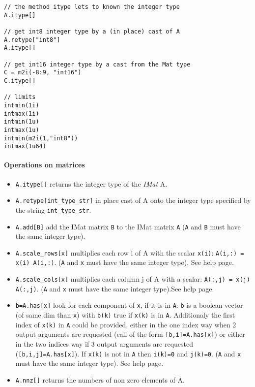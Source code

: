 \begin{mandescription}
\begin{Verbatim}
// the method itype lets to known the integer type
A.itype[]

// get int8 integer type by a (in place) cast of A
A.retype["int8"]
A.itype[]

// get int16 integer type by a cast from the Mat type
C = m2i(-8:9, "int16")
C.itype[]

// limits
intmin(1i)
intmax(1i)
intmin(1u)
intmax(1u)
intmin(m2i(1,"int8"))
intmax(1u64)
\end{Verbatim}


\end{mandescription}

\paragraph{Operations on matrices}


\begin{itemize}
\item \verb+A.itype[]+ returns the integer type of the \emph{IMat} A.
\item \verb+A.retype[int_type_str]+ in place cast of A onto the integer type specified by the string \verb+int_type_str+.
\item \verb+A.add[B]+  add the IMat matrix \verb+B+ to the IMat matrix \verb+A+ (\verb+A+ and \verb+B+ must have
the same  integer type).
\item \verb+A.scale_rows[x]+ multiplies each row i of A with the scalar \verb+x(i)+:
  \verb+A(i,:) = x(i) A(i,:)+.  (\verb+A+ and \verb+x+ must have the same  integer type). See  help page.
\item \verb+A.scale_cols[x]+ multiplies each column j of A with a scalar:
  \verb+A(:,j) = x(j) A(:,j)+. (\verb+A+ and \verb+x+ must have the same  integer type).See  help page.
\item \verb+b=A.has[x]+ look for each component of \verb+x+, 
  if it is in \verb+A+: \verb+b+ is a boolean vector 
  (of same dim than \verb+x+) with \verb+b(k)+ true if
  \verb+x(k)+ is in \verb+A+. Additionaly the first index of
  \verb+x(k)+ in \verb+A+ could be provided, either in the one index way
  when 2 output arguments are requested (call of the form \verb+[b,i]=A.has[x]+) or
  either in the two indices way if 3 output arguments are requested
  (\verb+[b,i,j]=A.has[x]+). If \verb+x(k)+ is not in \verb+A+ then
  \verb+i(k)=0+ and \verb+j(k)=0+. (\verb+A+ and \verb+x+ must have the same  integer type). See
   help page.
\item \verb+A.nnz[]+ returns the numbers of non zero elements of A.
\end{itemize}


